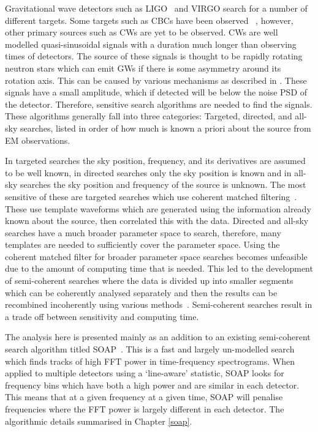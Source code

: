 %
Gravitational wave detectors such as \gls{LIGO}~\cite{abbott2009LIGOLaser,aasi2015AdvancedLIGO} and VIRGO
\cite{acernese2015AdvancedVirgo,acernese2008StatusVirgo} search for a number of different targets. 
Some targets such as \glspl{CBC} have been observed ~\cite{abbott2017GW170817Observation,abbott2017GW170814ThreeDetector,abbott2016ObservationGravitational},
however, other primary sources such as \glspl{CW} are yet to be observed.
\glspl{CW} are well modelled quasi-sinusoidal signals with a
duration much longer than observing times of detectors.
The source of these signals is thought to be rapidly rotating neutron stars which can emit \glspl{GW} if there is some asymmetry around its rotation axis. 
This can be caused by various mechanisms as described in \cite{prix2009GravitationalWaves}. 
These signals have a small amplitude, which if detected will be below the noise \gls{PSD} of the detector.
Therefore, sensitive search algorithms are needed to find the signals. 
These algorithms generally fall into three categories: Targeted,
directed, and all-sky searches, listed in order of how much is known a priori
about the source from \gls{EM} observations. 

%
In targeted searches the sky position, frequency, and its derivatives are
assumed to be well known, in directed searches only the sky position is
known and in all-sky searches the sky position and frequency of the source is unknown.
The most sensitive of these are targeted searches which use coherent matched
filtering~\cite{dupuis2005BayesianEstimation,schutz1998DataAnalysis}. These use
template waveforms which are generated using the information already known about the
source, then correlated this with the data. Directed and all-sky searches have
a much broader parameter space to search, therefore, many templates are needed
to sufficiently cover the parameter space. Using the coherent matched filter
for broader parameter space searches becomes unfeasible due to the amount of
computing time that is needed. This led to the development of semi-coherent
searches where the data is divided up into smaller segments which can be coherently analysed
separately and then the results can be recombined incoherently using various
methods~\cite{abbott2019AllskySearch,creighton2000SearchingPeriodic}. Semi-coherent
searches result in a trade off between sensitivity and computing time.

%
The analysis here is presented mainly as an addition to an existing
semi-coherent search algorithm titled SOAP~\cite{bayley2019SOAPGeneralised}.
This is a fast and largely un-modelled search which finds tracks of
high \gls{FFT} power in time-frequency spectrograms. 
When applied to multiple detectors using a `line-aware' statistic, SOAP looks for frequency bins which have both a high power and are similar in each detector. 
This means that  at a given frequency at a given time, SOAP will penalise frequencies where the \gls{FFT} power is largely different in each detector.  
The algorithmic details summarised in Chapter \ref{soap}. 


